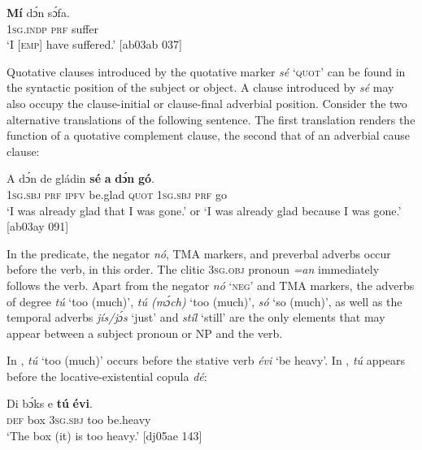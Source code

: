 \ea%
    \label{ex:key:519}
    \gll \textbf{Mí}    dɔ́n  sɔ́fa.\\
\textsc{1sg.indp}  \textsc{prf}  suffer\\

\glt ‘I [\textsc{emp}] have suffered.’ [ab03ab 037]
\z

Quotative clauses introduced by the quotative marker \textit{sé} ‘\textsc{quot}’ can be found in the syntactic position of the subject or object. A clause introduced by \textit{sé} may also occupy the clause-initial or clause-final adverbial position. Consider the two alternative translations of the following sentence. The first translation renders the function of a quotative complement clause, the second that of an adverbial cause clause: 


\ea%
    \label{ex:key:520}
    \gll A    dɔ́n  de  gládin  \textbf{sé}    \textbf{a}     \textbf{dɔ́n}   \textbf{gó}.\\
\textsc{1sg.sbj}  \textsc{prf}  \textsc{ipfv}  be.glad  \textsc{quot}    \textsc{1sg.sbj}  \textsc{prf}  go\\

\glt ‘I was already glad that I was gone.’ or 
‘I was already glad because I was gone.’ [ab03ay 091]
\z

In the predicate, the negator \textit{nó}, \textsc{TMA} markers, and preverbal adverbs occur before the verb, in this order. The clitic \textsc{3sg.obj} pronoun \textit{=an} immediately follows the verb. Apart from the negator \textit{nó} ‘\textsc{neg}’ and \textsc{TMA} markers, the adverbs of degree \textit{tú} ‘too (much)’, \textit{tú (mɔ́ch)} ‘too (much)', \textit{só} ‘so (much)’, as well as the temporal adverbs\textit{ jís}\textit{\textup{/}}\textit{jɔ́s} ‘just’ and \textit{stíl} ‘still’ are the only elements that may appear between a subject pronoun or NP and the verb. 


In , \textit{tú} ‘too (much)’ occurs before the stative verb \textit{évi} ‘be heavy’. In , \textit{tú} appears before the locative-existential copula \textit{dé}: 



\ea%
    \label{ex:key:521}
    \gll Di  bɔ́ks    e    \textbf{tú}  \textbf{évi}.\\
\textsc{def}  box    \textsc{3sg.sbj}  too  be.heavy\\

\glt ‘The box (it) is too heavy.’ [dj05ae 143]
\z


